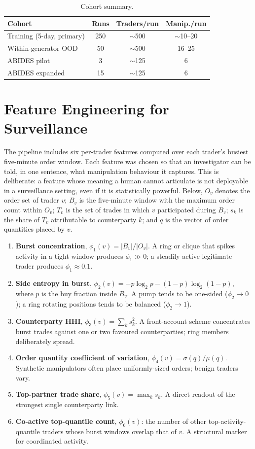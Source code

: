 \documentclass[10pt,twocolumn,letterpaper]{article}
\begin{document}
\begin{table}[t]
\caption{Cohort summary.}
\label{tab:cohorts}
\centering
\footnotesize
\begin{tabular}{lccc}
\toprule
Cohort & Runs & Traders/run & Manip./run \\
\midrule
Training (5-day, primary) & 250 & $\sim$500 & $\sim$10--20 \\
Within-generator OOD & 50 & $\sim$500 & 16--25 \\
ABIDES pilot & 3 & $\sim$125 & 6 \\
ABIDES expanded & 15 & $\sim$125 & 6 \\
\bottomrule
\end{tabular}
\end{table}

\section{Feature Engineering for Surveillance}
\label{sec:features}

The pipeline includes six per-trader features computed over each
trader's busiest five-minute order window. Each feature was chosen so
that an investigator can be told, in one sentence, what manipulation
behaviour it captures. This is deliberate: a feature whose meaning a
human cannot articulate is not deployable in a surveillance setting,
even if it is statistically powerful. Below, \(O_v\) denotes the order
set of trader \(v\); \(B_v\) is the five-minute window with the
maximum order count within \(O_v\); \(T_v\) is the set of trades in
which \(v\) participated during \(B_v\); \(s_k\) is the share of \(T_v\)
attributable to counterparty \(k\); and \(q\) is the vector of order
quantities placed by \(v\).

\begin{enumerate}
\item \textbf{Burst concentration}, \(\phi_1(v) = |B_v|/|O_v|\). A
ring or clique that spikes activity in a tight window produces
\(\phi_1 \gg 0\); a steadily active legitimate trader produces
\(\phi_1 \approx 0.1\).
\item \textbf{Side entropy in burst}, \(\phi_2(v) =
-p\log_2 p - (1{-}p)\log_2(1{-}p)\), where \(p\) is the buy fraction
inside \(B_v\). A pump tends to be one-sided ($\phi_2 \to 0$); a
ring rotating positions tends to be balanced ($\phi_2 \to 1$).
\item \textbf{Counterparty HHI}, \(\phi_3(v) = \sum_k s_k^2\). A
front-account scheme concentrates burst trades against one or two
favoured counterparties; ring members deliberately spread.
\item \textbf{Order quantity coefficient of variation},
\(\phi_4(v) = \sigma(q)/\mu(q)\). Synthetic manipulators often place
uniformly-sized orders; benign traders vary.
\item \textbf{Top-partner trade share}, \(\phi_5(v) = \max_k s_k\). A
direct readout of the strongest single counterparty link.
\item \textbf{Co-active top-quantile count}, \(\phi_6(v)\): the number
of other top-activity-quantile traders whose burst windows overlap that
of \(v\). A structural marker for coordinated activity.
\end{enumerate}
\end{document}
